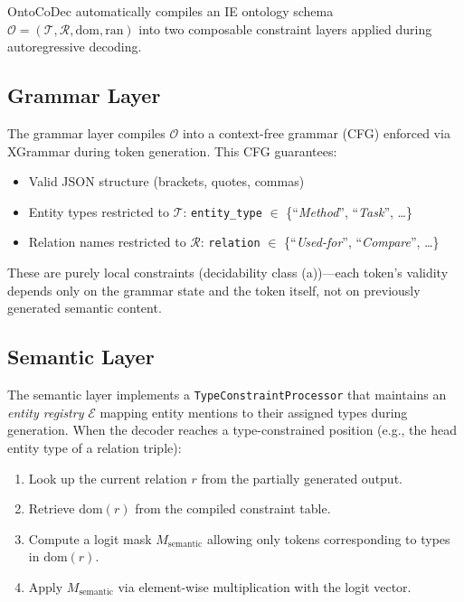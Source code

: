 \documentclass[11pt,a4paper]{article}
\newcommand{\sys}{OntoCoDec}
\begin{document}
\sys{} automatically compiles an IE ontology schema $\mathcal{O} = (\mathcal{T}, \mathcal{R}, \text{dom}, \text{ran})$ into two composable constraint layers applied during autoregressive decoding.

\subsection{Grammar Layer}
\label{sec:grammar}

The grammar layer compiles $\mathcal{O}$ into a context-free grammar (CFG) enforced via XGrammar during token generation. This CFG guarantees:
\begin{itemize}
\item Valid JSON structure (brackets, quotes, commas)
\item Entity types restricted to $\mathcal{T}$: \texttt{entity\_type} $\in$ \{``\textit{Method}'', ``\textit{Task}'', \ldots\}
\item Relation names restricted to $\mathcal{R}$: \texttt{relation} $\in$ \{``\textit{Used-for}'', ``\textit{Compare}'', \ldots\}
\end{itemize}

These are purely local constraints (decidability class (a))---each token's validity depends only on the grammar state and the token itself, not on previously generated semantic content.

\subsection{Semantic Layer}
\label{sec:semantic}

The semantic layer implements a \texttt{TypeConstraintProcessor} that maintains an \emph{entity registry} $\mathcal{E}$ mapping entity mentions to their assigned types during generation. When the decoder reaches a type-constrained position (e.g., the head entity type of a relation triple):

\begin{enumerate}
\item Look up the current relation $r$ from the partially generated output.
\item Retrieve $\text{dom}(r)$ from the compiled constraint table.
\item Compute a logit mask $M_{\text{semantic}}$ allowing only tokens corresponding to types in $\text{dom}(r)$.
\item Apply $M_{\text{semantic}}$ via element-wise multiplication with the logit vector.
\end{enumerate}
\end{document}

